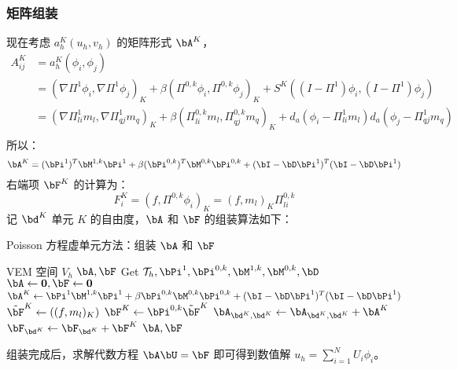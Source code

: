 \subsubsection{矩阵组装}
现在考虑 $a_h^K(u_h, v_h)$ 的矩阵形式 $\bA^K$，
$$
\begin{aligned}
A_{ij}^K & = a_h^K(\phi_i, \phi_j)\\
& = (\nabla \Pi^1 \phi_i, \nabla \Pi^1 \phi_j)_K + \beta(\Pi^{0, k}\phi_i,
\Pi^{0, k}\phi_j)_K + S^K((I-\Pi^1)\phi_i, (I-\Pi^1)\phi_j)\\
& = (\nabla \Pi^1_{li} m_l, \nabla \Pi^1_{qj} m_q)_K + \beta(\Pi^{0,
    k}_{li}m_l,
\Pi^{0, k}_{qj}m_q)_K + d_a(\phi_i-\Pi^1_{li}m_l)d_a(\phi_j-\Pi^1_{qj}m_q)\\
\end{aligned}
$$
所以：
$$
\bA^K = (\bPi^1)^T\bM^{1, k}\bPi^1 + \beta(\bPi^{0, k})^T\bM^{0, k} \bPi^{0, k} +
(\bI - \bD\bPi^1)^T(\bI - \bD\bPi^1)
$$
右端项 $\bF^K$ 的计算为：
$$
F_{i}^K = (f, \Pi^{0, k} \phi_i)_K = (f, m_l)_K \Pi^{0, k}_{li}
$$
记 $\bd^K$ 单元 $K$ 的自由度，$\bA$ 和 $\bF$ 的组装算法如下：
\begin{algorithm}[H]
\caption{Poisson 方程虚单元方法：组装 $\bA$ 和 $\bF$}\label{alg:assembleAF}
\begin{algorithmic}[1]
    \Require VEM 空间 $V_h$
    \Ensure $\bA, \bF$
    \State Get $\mathcal{T}_h, \bPi^1, \bPi^{0, k}, \bM^{1, k}, \bM^{0, k}, \bD$ 
    \State $\bA \gets \boldsymbol{0}, \bF \gets \boldsymbol{0}$
        \State $\bA^K \gets \bPi^1\bM^{1, k}\bPi^1 + \beta\bPi^{0, k}\bM^{0, k}\bPi^{0, k} +
        (\bI - \bD\bPi^1)^T(\bI - \bD\bPi^1)$
        \State $\tilde{\bF}^K \gets ((f, m_l)_K)$
        \State $\bF^K \gets \bPi^{0, k}\tilde{\bF}^K$ 
        \State $\bA_{\bd^K, \bd^K} \gets \bA_{\bd^K, \bd^K} + \bA^K$
        \State $\bF_{\bd^K} \gets \bF_{\bd^K} + \bF^K$
    \EndFor
    \State \Return $\bA, \bF$
\end{algorithmic}
\end{algorithm}
组装完成后，求解代数方程 $\bA \bU = \bF$ 即可得到数值解 $u_h = \sum_{i=1}^{N}
U_i \phi_i$。

